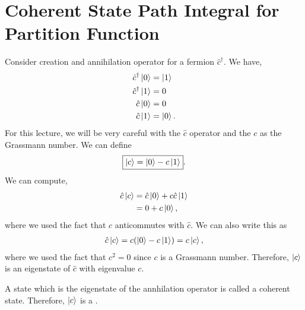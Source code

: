 \documentclass{article}
\numberwithin{equation}{section}
\begin{document}
    \section{Coherent State Path Integral for Partition Function}
    Consider creation and annihilation operator for a fermion $\hat{c}^\dagger$. We have,
    \begin{align}
        \hat{c}^\dagger \ket{0} &= \ket{1} \\
        \hat{c}^\dagger \ket{1} &= 0 \\
        \hat{c} \ket{0} &= 0 \\
        \hat{c} \ket{1} &= \ket{0}.
    \end{align} 
For this lecture, we will be very careful with the $\hat{c}$ operator and the $c$ as the Grassmann number. We can define 
\begin{equation}
    \boxed{\ket{c} = \ket{0} - c\ket{1}}.
\end{equation}
We can compute,
\begin{align}
    \hat{c}\ket{c} &= \hat{c}\ket{0} +c\hat{c}\ket{1} \\ 
    &= 0 + c\ket{0},
\end{align}
where we used the fact that $c$ anticommutes with $\hat{c}$. We can also write this as 
\begin{align}
    \hat{c}\ket{c} = c(\ket{0} - c\ket{1}) = c\ket{c},
\end{align}
where we used the fact that $c^2=0$ since $c$ is a Grassmann number. Therefore, $\ket{c}$ is an eigenstate of $\hat{c}$ with eigenvalue $c.$ 

A state which is the eigenstate of the annhilation operator is called a coherent state. Therefore, $\ket{c}$ is a . 
\end{document}
